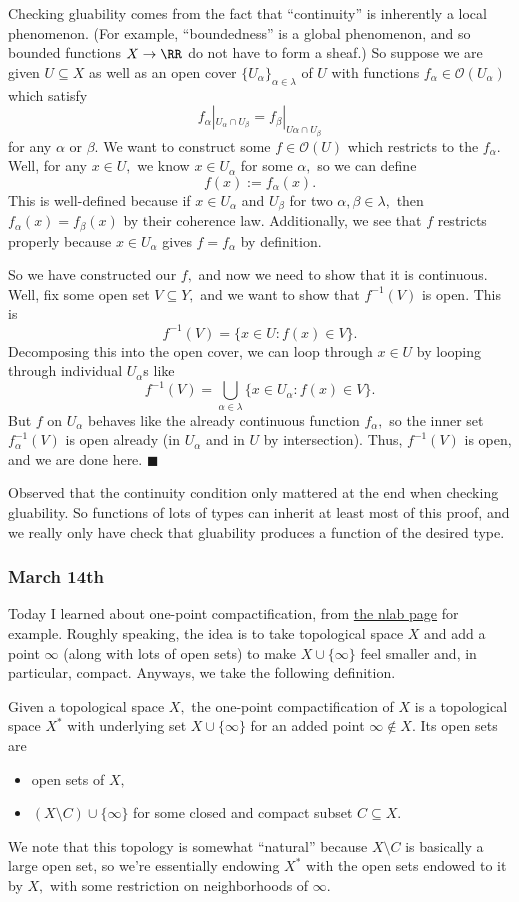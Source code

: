 Checking gluability comes from the fact that ``continuity'' is inherently a local phenomenon. (For example, ``boundedness'' is a global phenomenon, and so bounded functions $X\to\RR$ do not have to form a sheaf.) So suppose we are given $U\subseteq X$ as well as an open cover $\{U_\alpha\}_{\alpha\in\lambda}$ of $U$ with functions $f_\alpha\in\mathcal O(U_\alpha)$ which satisfy
\[f_\alpha|_{U_\alpha\cap U_\beta}=f_\beta|_{U\alpha\cap U_\beta}\]
for any $\alpha$ or $\beta.$ We want to construct some $f\in\mathcal O(U)$ which restricts to the $f_\alpha.$ Well, for any $x\in U,$ we know $x\in U_\alpha$ for some $\alpha,$ so we can define
\[f(x):=f_\alpha(x).\]
This is well-defined because if $x\in U_\alpha$ and $U_\beta$ for two $\alpha,\beta\in\lambda,$ then $f_\alpha(x)=f_\beta(x)$ by their coherence law. Additionally, we see that $f$ restricts properly because $x\in U_\alpha$ gives $f=f_\alpha$ by definition.

So we have constructed our $f,$ and now we need to show that it is continuous. Well, fix some open set $V\subseteq Y,$ and we want to show that $f^{-1}(V)$ is open. This is
\[f^{-1}(V)=\{x\in U:f(x)\in V\}.\]
Decomposing this into the open cover, we can loop through $x\in U$ by looping through individual $U_\alpha$s like
\[f^{-1}(V)=\bigcup_{\alpha\in\lambda}\{x\in U_\alpha:f(x)\in V\}.\]
But $f$ on $U_\alpha$ behaves like the already continuous function $f_\alpha,$ so the inner set $f_\alpha^{-1}(V)$ is open already (in $U_\alpha$ and in $U$ by intersection). Thus, $f^{-1}(V)$ is open, and we are done here. $\blacksquare$

Observed that the continuity condition only mattered at the end when checking gluability. So functions of lots of types can inherit at least most of this proof, and we really only have check that gluability produces a function of the desired type.

\subsubsection{March 14th}
Today I learned about one-point compactification, from \href{https://ncatlab.org/nlab/show/one-point+compactification}{the nlab page} for example. Roughly speaking, the idea is to take topological space $X$ and add a point $\infty$ (along with lots of open sets) to make $X\cup\{\infty\}$ feel smaller and, in particular, compact. Anyways, we take the following definition.
\begin{definition}
    Given a topological space $X,$ the one-point compactification of $X$ is a topological space $X^*$ with underlying set $X\cup\{\infty\}$ for an added point $\infty\notin X.$ Its open sets are
    \begin{itemize}
        \item open sets of $X,$
        \item $(X\setminus C)\cup\{\infty\}$ for some closed and compact subset $C\subseteq X.$
    \end{itemize}
\end{definition}
We note that this topology is somewhat ``natural'' because $X\setminus C$ is basically a large open set, so we're essentially endowing $X^*$ with the open sets endowed to it by $X,$ with some restriction on neighborhoods of $\infty.$

